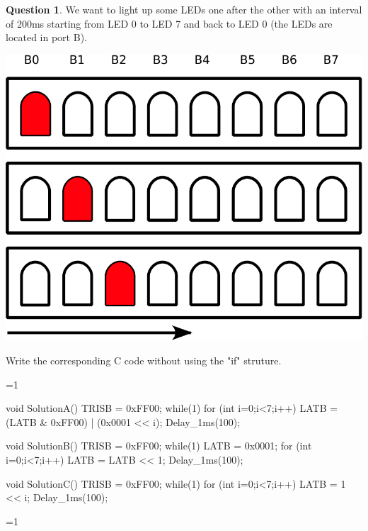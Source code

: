 \documentclass[11pt,a4paper,dvipsnames]{article}
\theoremstyle{definition}%
\newtheorem{Q}{Question}[] %
\newcounter{reponseCnt}
\begin{document}
\begin{Q}
We want to light up some LEDs one after the other with an interval of 200ms starting from LED 0 to LED 7 and back to LED 0 (the LEDs are located in port B).
\begin{center}
    \includegraphics[scale=0.4]{diagrampdf-crop.pdf}
\end{center}
Write the corresponding C code without using the "if" struture.

\ifnum\value{reponseCnt}=1
	\begin{uC}
	void SolutionA() {
		TRISB = 0xFF00;
		while(1)
		{
		  for (int i=0;i<7;i++)
		  {
		     LATB = (LATB & 0xFF00) | (0x0001 << i);
		     Delay_1ms(100);
		  }
		}
	}

	void SolutionB() {
		TRISB = 0xFF00;
		while(1)
		{
		  LATB = 0x0001;
		  for (int i=0;i<7;i++)
		  {
		     LATB = LATB << 1;
		     Delay_1ms(100);
		  }
		}
	}

	void SolutionC() {
		TRISB = 0xFF00;
		while(1)
		{
		  for (int i=0;i<7;i++)
		  {
		     LATB = 1 << i;
		     Delay_1ms(100);
		  }
		}
	}
\end{uC}
\fi

\end{Q}
\ifnum\value{reponseCnt}=1
  \newpage
\fi
\end{document}
